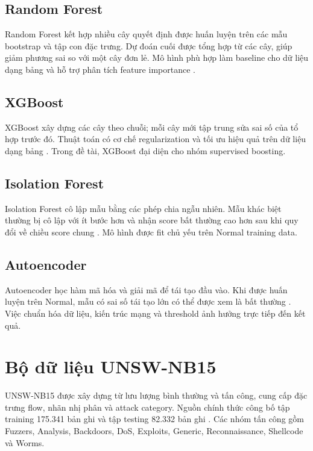\documentclass[12pt,a4paper,oneside]{report}
\begin{document}
\subsection{Random Forest}

Random Forest kết hợp nhiều cây quyết định được huấn luyện trên các mẫu bootstrap và tập con đặc trưng. Dự đoán cuối được tổng hợp từ các cây, giúp giảm phương sai so với một cây đơn lẻ. Mô hình phù hợp làm baseline cho dữ liệu dạng bảng và hỗ trợ phân tích feature importance \cite{breiman2001}.

\subsection{XGBoost}

XGBoost xây dựng các cây theo chuỗi; mỗi cây mới tập trung sửa sai số của tổ hợp trước đó. Thuật toán có cơ chế regularization và tối ưu hiệu quả trên dữ liệu dạng bảng \cite{chen2016}. Trong đề tài, XGBoost đại diện cho nhóm supervised boosting.

\subsection{Isolation Forest}

Isolation Forest cô lập mẫu bằng các phép chia ngẫu nhiên. Mẫu khác biệt thường bị cô lập với ít bước hơn và nhận score bất thường cao hơn sau khi quy đổi về chiều score chung \cite{liu2008}. Mô hình được fit chủ yếu trên Normal training data.

\subsection{Autoencoder}

Autoencoder học hàm mã hóa và giải mã để tái tạo đầu vào. Khi được huấn luyện trên Normal, mẫu có sai số tái tạo lớn có thể được xem là bất thường \cite{sakurada2014}. Việc chuẩn hóa dữ liệu, kiến trúc mạng và threshold ảnh hưởng trực tiếp đến kết quả.

\section{Bộ dữ liệu UNSW-NB15}

UNSW-NB15 được xây dựng từ lưu lượng bình thường và tấn công, cung cấp đặc trưng flow, nhãn nhị phân và attack category. Nguồn chính thức công bố tập training 175.341 bản ghi và tập testing 82.332 bản ghi \cite{unswsite,moustafa2015}. Các nhóm tấn công gồm Fuzzers, Analysis, Backdoors, DoS, Exploits, Generic, Reconnaissance, Shellcode và Worms.
\end{document}
